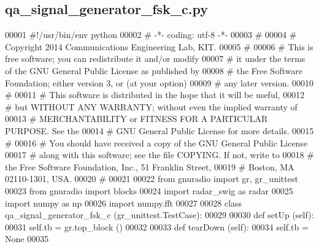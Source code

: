 \subsection{qa\+\_\+signal\+\_\+generator\+\_\+fsk\+\_\+c.\+py}
\label{qa__signal__generator__fsk__c_8py_source}

\begin{DoxyCode}
00001 \textcolor{comment}{#!/usr/bin/env python}
00002 \textcolor{comment}{# -*- coding: utf-8 -*-}
00003 \textcolor{comment}{# }
00004 \textcolor{comment}{# Copyright 2014 Communications Engineering Lab, KIT.}
00005 \textcolor{comment}{# }
00006 \textcolor{comment}{# This is free software; you can redistribute it and/or modify}
00007 \textcolor{comment}{# it under the terms of the GNU General Public License as published by}
00008 \textcolor{comment}{# the Free Software Foundation; either version 3, or (at your option)}
00009 \textcolor{comment}{# any later version.}
00010 \textcolor{comment}{# }
00011 \textcolor{comment}{# This software is distributed in the hope that it will be useful,}
00012 \textcolor{comment}{# but WITHOUT ANY WARRANTY; without even the implied warranty of}
00013 \textcolor{comment}{# MERCHANTABILITY or FITNESS FOR A PARTICULAR PURPOSE.  See the}
00014 \textcolor{comment}{# GNU General Public License for more details.}
00015 \textcolor{comment}{# }
00016 \textcolor{comment}{# You should have received a copy of the GNU General Public License}
00017 \textcolor{comment}{# along with this software; see the file COPYING.  If not, write to}
00018 \textcolor{comment}{# the Free Software Foundation, Inc., 51 Franklin Street,}
00019 \textcolor{comment}{# Boston, MA 02110-1301, USA.}
00020 \textcolor{comment}{# }
00021 
00022 \textcolor{keyword}{from} gnuradio \textcolor{keyword}{import} gr, gr\_unittest
00023 \textcolor{keyword}{from} gnuradio \textcolor{keyword}{import} blocks
00024 \textcolor{keyword}{import} radar\_swig \textcolor{keyword}{as} radar
00025 \textcolor{keyword}{import} numpy \textcolor{keyword}{as} np
00026 \textcolor{keyword}{import} numpy.fft
00027 
00028 \textcolor{keyword}{class }qa_signal_generator_fsk_c (gr\_unittest.TestCase):
00029 
00030     \textcolor{keyword}{def }setUp (self):
00031         self.tb = gr.top\_block ()
00032 
00033     \textcolor{keyword}{def }tearDown (self):
00034         self.tb = \textcolor{keywordtype}{None}
00035 

\end{DoxyCode}
